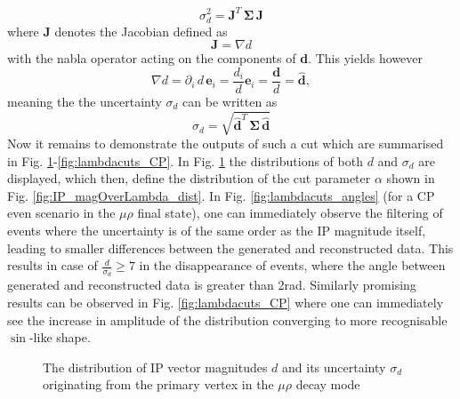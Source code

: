\begin{equation}
	\sigma_{d}^2 = \mathbf{J}^T \, \boldsymbol{\Sigma} \, \mathbf{J}
\end{equation}
where \textbf{J} denotes the Jacobian defined as
\begin{equation}
	\mathbf{J} = \nabla d
\end{equation}
with the nabla operator acting on the components of \textbf{d}. This yields however
\begin{equation}
	\nabla d = \partial_i \, d \, \boldsymbol{e}_i = \frac{d_i}{d}\boldsymbol{e}_i = \frac{\boldsymbol{d}}{d} = \boldsymbol{\hat{d}},
\end{equation}
meaning the the uncertainty $\sigma_{d}$ can be written as
\begin{equation}
	\sigma_{d} = \sqrt{\boldsymbol{\hat{d}}^T \, \boldsymbol{\Sigma} \, \boldsymbol{\hat{d}}}
\end{equation}
Now it remains to demonstrate the outputs of such a cut which are summarised in Fig. \ref{fig:lambda_dist}-\ref{fig:lambdacuts_CP}. In Fig. \ref{fig:lambda_dist} the distributions of both $d$ and $\sigma_{d}$ are displayed, which then, define the distribution of the cut parameter $\alpha$ shown in Fig. \ref{fig:IP_magOverLambda_dist}. In Fig. \ref{fig:lambdacuts_angles} (for a CP even scenario in the $\mu\rho$ final state), one can immediately observe the filtering of events where the uncertainty is of the same order as the IP magnitude itself, leading to smaller differences between the generated and reconstructed data. This results in case of $\frac{d}{\sigma_d}\geq7$ in the disappearance of events, where the angle between generated and reconstructed data is greater than 2rad. Similarly promising results can be observed in Fig. \ref{fig:lambdacuts_CP} where one can immediately see the increase in amplitude of the distribution converging to more recognisable $\sin$-like shape.\\
\begin{figure}[h]
	\centering
	\caption{The distribution of IP vector magnitudes $d$ and its uncertainty $\sigma_{d}$ originating from the primary vertex in the $\mu\rho$ decay mode}
	\label{fig:lambda_dist}
\end{figure}
